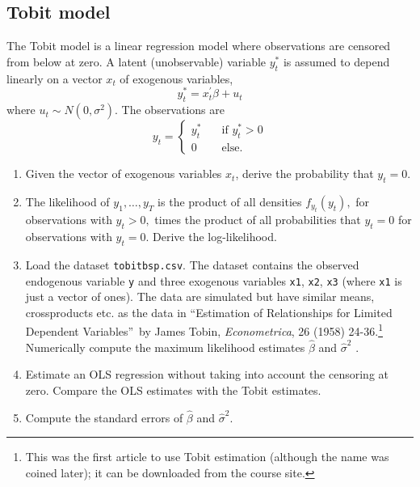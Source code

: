 \documentclass{article}
\begin{document}
\subsection{Tobit model\label{mltobit}}

The Tobit model is a linear regression model where observations are censored
from below at zero. A latent (unobservable) variable $y_{t}^{\ast }$ is
assumed to depend linearly on a vector $x_{t}$ of exogenous variables,%
\begin{equation*}
y_{t}^{\ast }=x_{t}^{\prime }\beta +u_{t}
\end{equation*}%
where $u_{t}\sim N(0,\sigma ^{2})$. The observations are%
\begin{equation*}
y_{t}=\left\{
\begin{array}{ll}
y_{t}^{\ast } & \quad \text{if }y_{t}^{\ast }>0 \\
0 & \quad \text{else.}%
\end{array}%
\right.
\end{equation*}

\begin{enumerate}
\item Given the vector of exogenous variables $x_{t}$, derive the
probability that $y_{t}=0$.

\item The likelihood of $y_{1},\ldots ,y_{T}$ is the product of all
densities $f_{y_{t}}(y_{t}),$ for observations with $y_{t}>0,$ times the
product of all probabilities that $y_{t}=0$ for observations with $y_{t}=0$.
Derive the log-likelihood.

\item Load the dataset \texttt{tobitbsp.csv}. The dataset contains the
observed endogenous variable \texttt{y} and three exogenous variables
\texttt{x1}, \texttt{x2}, \texttt{x3} (where \texttt{x1} is just a vector of
ones). The data are simulated but have similar means, crossproducts etc. as
the data in \textquotedblleft Estimation of Relationships for Limited
Dependent Variables\textquotedblright\ by James Tobin, \emph{Econometrica},
26 (1958) 24-36.\footnote{%
This was the first article to use Tobit estimation (although the name was
coined later); it can be downloaded from the course site.} Numerically
compute the maximum likelihood estimates $\hat{\beta}$ and $\hat{\sigma}^{2}$%
.

\item Estimate an OLS regression without taking into account the censoring
at zero. Compare the OLS estimates with the Tobit estimates.

\item Compute the standard errors of $\hat{\beta}$ and $\hat{\sigma}^{2}.$
\end{enumerate}
\end{document}
